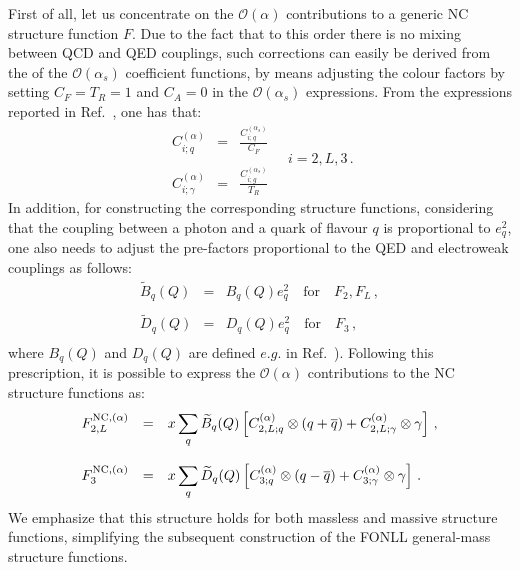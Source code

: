 First of all, let us concentrate on the $\mathcal{O}(\alpha)$
contributions to a generic NC structure function $F$.
%
Due to the
fact that to this order there is no mixing between QCD and QED
couplings, such corrections can easily be derived from the
of the $\mathcal{O}(\alpha_s)$ coefficient functions,
by means adjusting the colour factors by setting
$C_F=T_R=1$ and $C_A=0$ in the $\mathcal{O}(\alpha_s)$
expressions.
%
From the expressions reported in Ref.~\cite{Ellis:1991qj}, one 
has that:
\begin{equation}\label{eq:alphaCFs}
\begin{array}{rcl}
\displaystyle C_{i;q}^{(\alpha)} &=& \displaystyle \frac{C_{i;q}^{(\alpha_s)}}{C_F}\\
\\
\displaystyle C_{i;\gamma}^{(\alpha)} &=& \displaystyle \frac{C_{i;g}^{(\alpha_s)}}{T_R}
\end{array}\quad i = 2,L,3\,.
\end{equation}
In addition, for constructing the corresponding structure functions,
considering that the coupling between a photon and a quark of flavour
$q$ is proportional to $e_q^2$, one also needs to adjust the
pre-factors proportional to the QED and electroweak couplings
as follows:
 \begin{equation}
\begin{array}{rcl}
\widetilde{B}_q(Q) &=& B_q(Q)e_q^2\quad\mbox{for}\quad F_2,F_L\,, \\
\\
\widetilde{D}_q(Q) &=& D_q(Q)e_q^2\quad\mbox{for}\quad F_3\,, \\
\end{array}
\end{equation}
where $B_q(Q)$ and $D_q(Q)$ are defined $e.g.$
in Ref.~\cite{Adloff:2003uh}).
%
Following this prescription, it is possible to
express the $\mathcal{O}(\alpha)$ contributions to the NC structure
functions as:
\begin{equation}
\begin{array}{rcl}
F_{2,L}^{{\rm NC},(\alpha)} &=& \displaystyle x \sum_{q} \widetilde{B}_q(Q)\left[C_{2,L;q}^{(\alpha)}\otimes
(q+\overline{q}) + C_{2,L;\gamma}^{(\alpha)} \otimes \gamma
                         \right]\,,\\
\\
F_3^{{\rm NC},(\alpha)} &=& \displaystyle x \sum_{q} \widetilde{D}_q(Q)\left[C_{3;q}^{(\alpha)}\otimes
(q-\overline{q}) + C_{3;\gamma}^{(\alpha)} \otimes \gamma
                         \right]\,.
\end{array}
\end{equation}
We emphasize that this structure holds for both
massless and massive structure functions,
simplifying the subsequent
construction of the FONLL general-mass structure functions.


